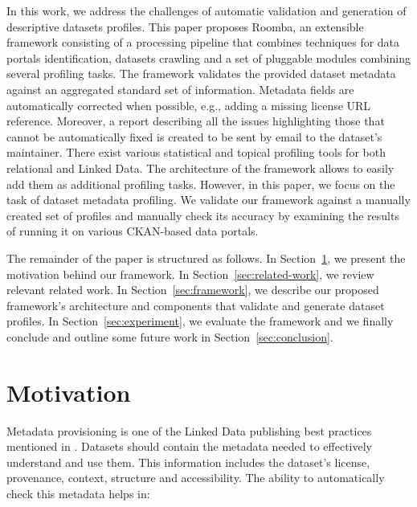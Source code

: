 \documentclass[runningheads,a4paper]{llncs}
\begin{document}
In this work, we address the challenges of automatic validation and generation of descriptive datasets profiles. This paper proposes Roomba, an extensible framework consisting of a processing pipeline that combines techniques for data portals identification, datasets crawling and a set of pluggable modules combining several profiling tasks. The framework validates the provided dataset metadata against an aggregated standard set of information. Metadata fields are automatically corrected when possible, e.g., adding a missing license URL reference. Moreover, a report describing all the issues highlighting those that cannot be automatically fixed is created to be sent by email to the dataset's maintainer. There exist various statistical and topical profiling tools for both relational and Linked Data. The architecture of the framework allows to easily add them as additional profiling tasks. However, in this paper, we focus on the task of dataset metadata profiling. We validate our framework against a manually created set of profiles and manually check its accuracy by examining the results of running it on various CKAN-based data portals.

The remainder of the paper is structured as follows. In Section~\ref{sec:motivation}, we present the motivation behind our framework. In Section~\ref{sec:related-work}, we review relevant related work. In Section~\ref{sec:framework}, we describe our proposed framework's architecture and components that validate and generate dataset profiles. In Section~\ref{sec:experiment}, we evaluate the framework and we finally conclude and outline some future work in Section~\ref{sec:conclusion}.

\section{Motivation}
\label{sec:motivation}

Metadata provisioning is one of the Linked Data publishing best practices mentioned in \cite{Bizer:2011:EWG:2075914.2075915}. Datasets should contain the metadata needed to effectively understand and use them. This information includes the dataset's license, provenance, context, structure and accessibility. The ability to automatically check this metadata helps in:
\end{document}
